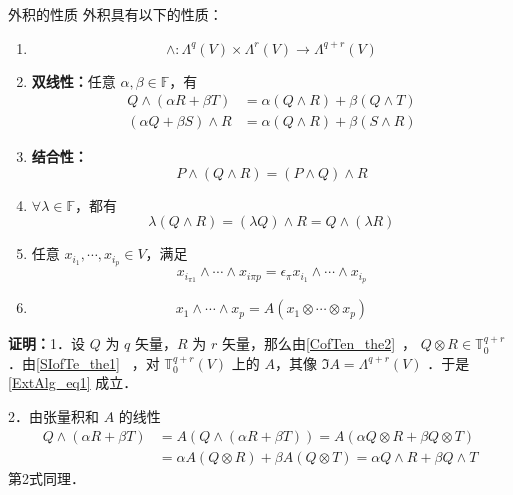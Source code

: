 \begin{theorem}{外积的性质}
外积具有以下的性质：
\begin{enumerate}
\item \begin{equation}\label{ExtAlg_eq1}
\wedge:\Lambda^q(V)\times\Lambda^r(V)\rightarrow\Lambda^{q+r}(V)
\end{equation}
\item \textbf{双线性：}任意 $\alpha,\beta\in\mathbb F$，有
\begin{equation}
\begin{aligned}
Q\wedge(\alpha R+\beta T)&=\alpha(Q\wedge R)+\beta(Q\wedge T)\\
(\alpha Q+\beta S)\wedge R&=\alpha (Q\wedge R)+\beta (S\wedge R)
\end{aligned}
\end{equation}
\item \textbf{结合性：}
\begin{equation}
P\wedge (Q\wedge R)=(P\wedge Q)\wedge R
\end{equation}
\item $\forall \lambda\in\mathbb F$，都有
\begin{equation}\label{ExtAlg_eq4}
\lambda(Q\wedge R)=(\lambda Q)\wedge R=Q\wedge(\lambda R)
\end{equation}

\item 任意 $x_{i_1},\cdots,x_{i_p}\in V$，满足
\begin{equation}\label{ExtAlg_eq6}
x_{i_{\pi 1}}\wedge\cdots \wedge x_{i\pi p}=\epsilon_\pi x_{i_1}\wedge\cdots\wedge x_{i_p}
\end{equation}
\item 
\begin{equation}\label{ExtAlg_eq7}
x_1\wedge\cdots\wedge x_p=A(x_1\otimes\cdots\otimes x_p)
\end{equation}
\end{enumerate}

\end{theorem}
\textbf{证明：}1．设 $Q$ 为 $q$ 矢量，$R$ 为 $r$ 矢量，那么由\autoref{CofTen_the2}~， $Q\otimes R\in\mathbb T_0^{q+r}$ ．由\autoref{SIofTe_the1}~ ，对 $\mathbb T_0^{q+r}(V)$ 上的 $A$，其像 $\Im A=\Lambda ^{q+r}(V)$ ．于是\autoref{ExtAlg_eq1} 成立．

2．由张量积和 $A$ 的线性
\begin{equation}
\begin{aligned}
Q\wedge(\alpha R+\beta T)&=A(Q\wedge(\alpha R+\beta T))=A(\alpha Q\otimes R+\beta Q\otimes T)\\
&=\alpha A(Q\otimes R)+\beta A(Q\otimes T)=\alpha Q\wedge R+\beta Q\wedge T
\end{aligned}
\end{equation}
第2式同理．


